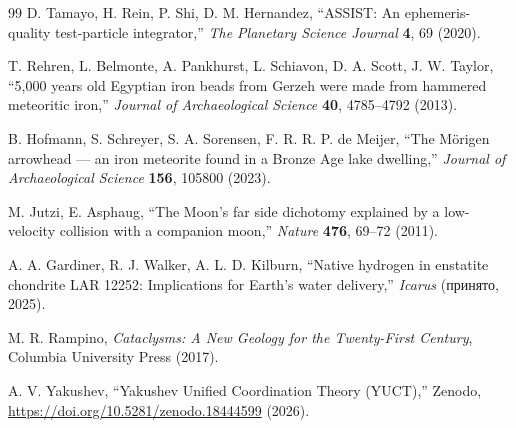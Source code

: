 \documentclass[11pt,a4paper]{article}
\begin{document}
\begin{thebibliography}{99}
		D. Tamayo, H. Rein, P. Shi, D. M. Hernandez, ``ASSIST: An ephemeris-quality test-particle integrator,''
		\emph{The Planetary Science Journal} \textbf{4}, 69 (2020).
		
		T. Rehren, L. Belmonte, A. Pankhurst, L. Schiavon, D. A. Scott, J. W. Taylor, ``5,000 years old Egyptian iron beads from Gerzeh were made from hammered meteoritic iron,''
		\emph{Journal of Archaeological Science} \textbf{40}, 4785–4792 (2013).
		
		B. Hofmann, S. Schreyer, S. A. Sorensen, F. R. R. P. de Meijer, ``The Mörigen arrowhead — an iron meteorite found in a Bronze Age lake dwelling,''
		\emph{Journal of Archaeological Science} \textbf{156}, 105800 (2023).
		
		M. Jutzi, E. Asphaug, ``The Moon's far side dichotomy explained by a low-velocity collision with a companion moon,''
		\emph{Nature} \textbf{476}, 69–72 (2011).
		
		A. A. Gardiner, R. J. Walker, A. L. D. Kilburn, ``Native hydrogen in enstatite chondrite LAR 12252: Implications for Earth's water delivery,''
		\emph{Icarus} (принято, 2025).
		
		M. R. Rampino, \emph{Cataclysms: A New Geology for the Twenty-First Century},
		Columbia University Press (2017).
		
		A. V. Yakushev, ``Yakushev Unified Coordination Theory (YUCT),''
		Zenodo, \url{https://doi.org/10.5281/zenodo.18444599} (2026).
		

\end{thebibliography}
\end{document}
